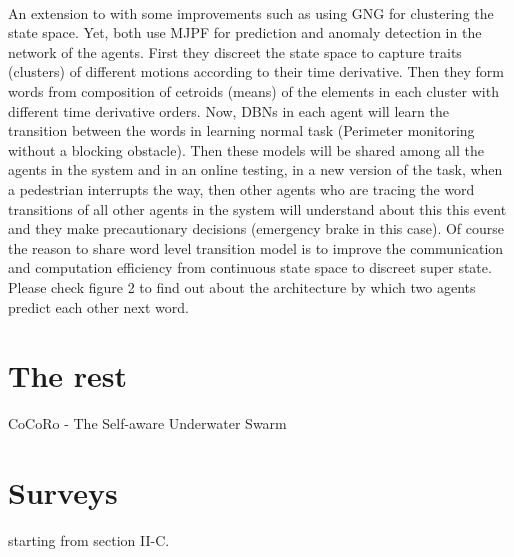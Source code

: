 \documentclass{article}
\begin{document}
				\paragraph{\cite{kanapram-2020-collective-awareness-for-abnormality-detection-in-connected-autonomous-vehicles}} An extension to \cite{kanapram-2019-self-awareness-in-intelligent-vehicles-experience-based-abnormality-detection} with some improvements such as using GNG for clustering the state space. Yet, both use MJPF for prediction and anomaly detection in the network of the agents. First they discreet the state space to capture traits (clusters) of different motions according to their time derivative. Then they form words  from composition of cetroids (means) of the elements in each cluster with different time derivative orders.  Now, DBNs in each agent will learn the transition between the words in learning normal task (Perimeter monitoring without a blocking obstacle).  Then these models will be shared among all the agents in the system and in an online testing, in a new version of the task, when a pedestrian interrupts the way, then other agents who are tracing the word transitions of all other agents in the system will understand about this  this event and they make precautionary decisions (emergency brake in this case).  Of course the reason to share word level transition model is to improve the communication and computation efficiency from continuous state space to discreet super state. Please check figure 2 to find out about the architecture by which two agents predict each other next word. 	
		
	\section{The rest}
	\cite{kernbach-2011-awareness-and-self-awareness-for-multi-robot-organisms}
	 
	CoCoRo - The Self-aware Underwater Swarm \cite{schmickl-2011-cocoro-the-self-aware-underwater-swarm}
	\section{Surveys}
	\cite{lewis-2011-a-survey-of-self-awareness-and-its-application-in-computing-systems} starting from section II-C.
	
	
\end{document}
